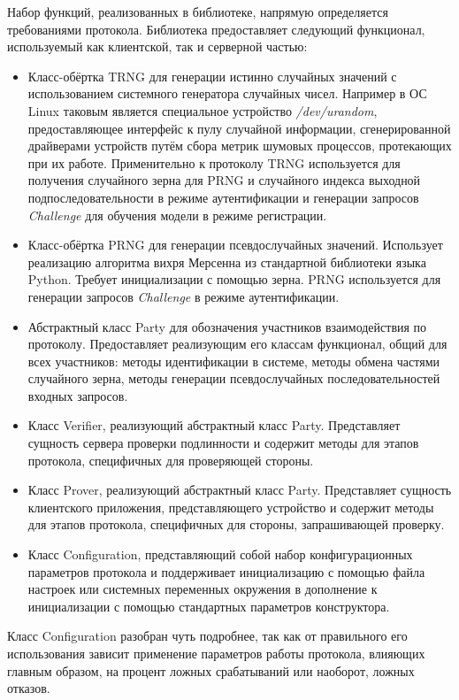 \clearpage
Набор функций, реализованных в библиотеке, напрямую определяется требованиями протокола. Библиотека предоставляет следующий функционал, используемый как клиентской, так и серверной частью:
\begin{itemize}
  \item Класс-обёртка TRNG для генерации истинно случайных значений с использованием системного генератора случайных чисел. Например в ОС Linux таковым является специальное устройство \emph{/dev/urandom}, предоставляющее интерфейс к пулу случайной информации, сгенерированной драйверами устройств путём сбора метрик шумовых процессов, протекающих при их работе. Применительно к протоколу TRNG используется для получения случайного зерна для PRNG и случайного индекса выходной подпоследовательности в режиме аутентификации и генерации запросов \emph{Challenge} для обучения модели в режиме регистрации.
  \item Класс-обёртка PRNG для генерации псевдослучайных значений. Использует реализацию алгоритма вихря Мерсенна из стандартной библиотеки языка Python. Требует инициализации с помощью зерна. PRNG используется для генерации запросов \emph{Challenge} в режиме аутентификации.
  \item Абстрактный класс Party для обозначения участников взаимодействия по протоколу. Предоставляет реализующим его классам функционал, общий для всех участников: методы идентификации в системе, методы обмена частями случайного зерна, методы генерации псевдослучайных последовательностей входных запросов.
  \item Класс Verifier, реализующий абстрактный класс Party. Представляет сущность сервера проверки подлинности и содержит методы для этапов протокола, специфичных для проверяющей стороны.
  \item Класс Prover, реализующий абстрактный класс Party. Представляет сущность клиентского приложения, представляющего устройство и содержит методы для этапов протокола, специфичных для стороны, запрашивающей проверку.
  \item Класс Configuration, представляющий собой набор конфигурационных параметров протокола и поддерживает инициализацию с помощью файла настроек или системных переменных окружения в дополнение к инициализации с помощью стандартных параметров конструктора.
\end{itemize}

Класс Configuration разобран чуть подробнее, так как от правильного его использования зависит применение параметров работы протокола, влияющих главным образом, на процент ложных срабатываний или наоборот, ложных отказов.
\clearpage


